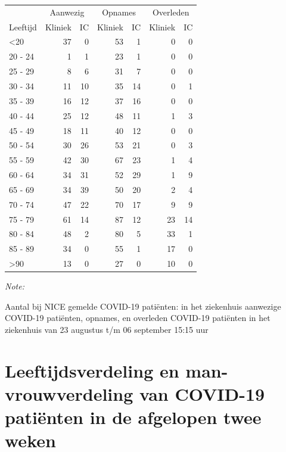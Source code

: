 \documentclass[
  english,
  man,floatsintext]{apa6}
\begin{document}
\begin{table}
\centering\begingroup\fontsize{10}{12}\selectfont

\begin{threeparttable}
\begin{tabular}{lrrrrrr}
\toprule
\multicolumn{1}{c}{ } & \multicolumn{2}{c}{Aanwezig} & \multicolumn{2}{c}{Opnames} & \multicolumn{2}{c}{Overleden} \\
\cmidrule(l{3pt}r{3pt}){2-3} \cmidrule(l{3pt}r{3pt}){4-5} \cmidrule(l{3pt}r{3pt}){6-7}
Leeftijd & Kliniek & IC & Kliniek & IC & Kliniek & IC\\
\midrule
<20 & 37 & 0 & 53 & 1 & 0 & 0\\
20 - 24 & 1 & 1 & 23 & 1 & 0 & 0\\
25 - 29 & 8 & 6 & 31 & 7 & 0 & 0\\
30 - 34 & 11 & 10 & 35 & 14 & 0 & 1\\
35 - 39 & 16 & 12 & 37 & 16 & 0 & 0\\
40 - 44 & 25 & 12 & 48 & 11 & 1 & 3\\
45 - 49 & 18 & 11 & 40 & 12 & 0 & 0\\
50 - 54 & 30 & 26 & 53 & 21 & 0 & 3\\
55 - 59 & 42 & 30 & 67 & 23 & 1 & 4\\
60 - 64 & 34 & 31 & 52 & 29 & 1 & 9\\
65 - 69 & 34 & 39 & 50 & 20 & 2 & 4\\
70 - 74 & 47 & 22 & 70 & 17 & 9 & 9\\
75 - 79 & 61 & 14 & 87 & 12 & 23 & 14\\
80 - 84 & 48 & 2 & 80 & 5 & 33 & 1\\
85 - 89 & 34 & 0 & 55 & 1 & 17 & 0\\
>90 & 13 & 0 & 27 & 0 & 10 & 0\\
\bottomrule
\end{tabular}
\begin{tablenotes}
\item \textit{Note: } 
\item Aantal bij NICE gemelde COVID-19 patiënten: in het ziekenhuis aanwezige COVID-19 patiënten, opnames, en overleden COVID-19 patiënten in het ziekenhuis van 23 augustus t/m 06 september 15:15 uur
\end{tablenotes}
\end{threeparttable}
\endgroup{}
\end{table}

\newpage

\hypertarget{leeftijdsverdeling-en-man-vrouwverdeling-van-covid-19-patiuxebnten-in-de-afgelopen-twee-weken}{%
\section{Leeftijdsverdeling en man-vrouwverdeling van COVID-19 patiënten in de afgelopen twee weken}\label{leeftijdsverdeling-en-man-vrouwverdeling-van-covid-19-patiuxebnten-in-de-afgelopen-twee-weken}}
\end{document}
